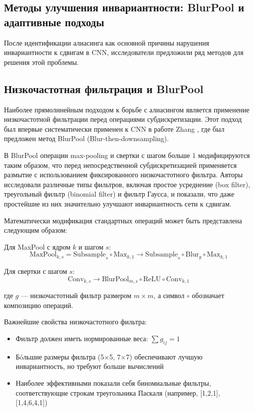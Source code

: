 \subsection{Методы улучшения инвариантности: BlurPool и адаптивные подходы}
\label{review:antialias:blurpool_and_adaptive}

После идентификации алиасинга как основной причины нарушения инвариантности к сдвигам в CNN, исследователи предложили ряд методов для решения этой проблемы.

\subsection{Низкочастотная фильтрация и BlurPool}
\label{review:antialias:blurpool}

Наиболее прямолинейным подходом к борьбе с алиасингом является применение низкочастотной фильтрации перед операциями субдискретизации. Этот подход был впервые систематически применен к CNN в работе Zhang \cite{Zhang2019}, где был предложен метод BlurPool (Blur-then-downsampling).

В BlurPool операции max-pooling и свертки с шагом больше 1 модифицируются таким образом, что перед непосредственной субдискретизацией применяется размытие с использованием фиксированного низкочастотного фильтра. Авторы исследовали различные типы фильтров, включая простое усреднение (box filter), треугольный фильтр (binomial filter) и фильтр Гаусса, и показали, что даже простейшие из них значительно улучшают инвариантность сети к сдвигам.

Математически модификация стандартных операций может быть представлена следующим образом:

Для MaxPool с ядром $k$ и шагом $s$:
\begin{equation}
\text{MaxPool}_{k,s} = \text{Subsample}_{s} \circ \text{Max}_{k,1} \longrightarrow \text{Subsample}_{s} \circ \text{Blur}_{g} \circ \text{Max}_{k,1}
\end{equation}

Для свертки с шагом $s$:
\begin{equation}
\text{Conv}_{k,s} \longrightarrow \text{BlurPool}_{m,s} \circ \text{ReLU} \circ \text{Conv}_{k,1}
\end{equation}

где $g$ — низкочастотный фильтр размером $m \times m$, а символ $\circ$ обозначает композицию операций.

Важнейшие свойства низкочастотного фильтра:
\begin{itemize}
    \item Фильтр должен иметь нормированные веса: $\sum g_{ij} = 1$
    \item Бóльшие размеры фильтра (5×5, 7×7) обеспечивают лучшую инвариантность, но требуют больше вычислений
    \item Наиболее эффективными показали себя биномиальные фильтры, соответствующие строкам треугольника Паскаля (например, [1,2,1], [1,4,6,4,1])
\end{itemize}

